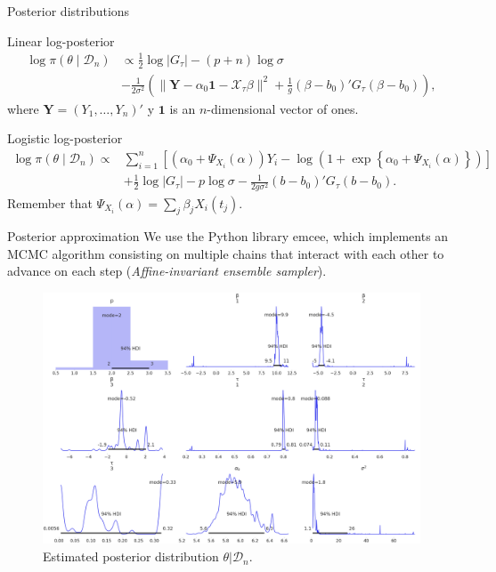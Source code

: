 \documentclass[10pt, english, professionalfonts]{beamer}
\newcommand\maroon[1]{\color{mLightBrown}#1\color{mDarkTeal}}
\begin{document}
\begin{frame}{Posterior distributions}
  \begin{block}{Linear log-posterior}
    \vspace{-1em}
    \begin{align*}
  \log \pi(\theta\mid \mathcal D_n) &\propto \frac{1}{2}\log |G_\tau| - (p+n)\log \sigma\\
  &-\frac{1}{2\sigma^2} \left(\|\boldsymbol{Y}-\alpha_0\boldsymbol{1} - \mathcal X_\tau\beta\|^2 + \frac{1}{g}(\beta - b_0)'G_\tau(\beta - b_0) \right),
\end{align*}
where \(\bm Y=(Y_1,\dots,Y_n)'\) y \(\bm{1}\) is an \(n\)-dimensional vector of ones.
  \end{block}

\vspace{1em}
  \begin{block}{Logistic log-posterior}
      \vspace{-1em}
    \begin{align*}
  \log \pi(\theta \mid \mathcal D_n) \propto {} & \sum_{i=1}^n \left[ \left(\alpha_0 + \Psi_{X_i}(\alpha)\right)Y_i - \log\left(1 + \exp\left\{\alpha_0 + \Psi_{X_i}(\alpha)\right\}\right)\right]\\
  \quad &+ \frac{1}{2}\log |G_\tau| - p\log \sigma -\frac{1}{2g\sigma^2} (b - b_0)'G_\tau(b - b_0).
\end{align*}
Remember that \(\Psi_{X_i}(\alpha) = \sum_j \beta_j X_i(t_j)\).
  \end{block}
\end{frame}

\begin{frame}{Posterior approximation}
  We use the Python library \maroon{emcee}, which implements an MCMC algorithm consisting on multiple chains that interact with each other to advance on each step (\textit{Affine-invariant ensemble sampler}).

  \vspace{1em}

  \begin{figure}
    \includegraphics[width=.7\textwidth]{img/posterior}
    \caption{Estimated posterior distribution \(\theta|\mathcal D_n\).}
  \end{figure}
\end{frame}
\end{document}
